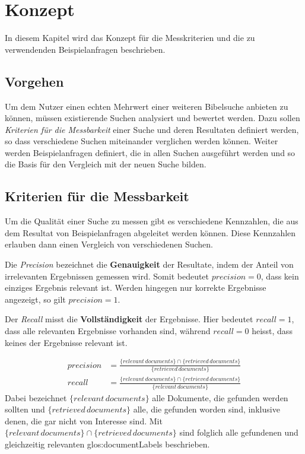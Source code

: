 \chapter{Konzept}
In diesem Kapitel wird das Konzept für die Messkriterien und die zu verwendenden Beispielanfragen beschrieben.

\section{Vorgehen}
Um dem Nutzer einen echten Mehrwert einer weiteren Bibelsuche anbieten zu können, müssen existierende Suchen analysiert und bewertet werden.
Dazu sollen \textit{Kriterien für die Messbarkeit} einer Suche und deren Resultaten definiert werden, so dass verschiedene Suchen miteinander verglichen werden können.
Weiter werden Beispielanfragen definiert, die in allen Suchen ausgeführt werden und so die Basis für den Vergleich mit der neuen Suche bilden.

\section{Kriterien für die Messbarkeit}
Um die Qualität einer Suche zu messen gibt es verschiedene Kennzahlen, die aus dem Resultat von Beispielanfragen abgeleitet werden können. Diese Kennzahlen erlauben dann einen Vergleich von verschiedenen Suchen.

Die \textit{Precision} bezeichnet die \textbf{Genauigkeit} der Resultate, indem der Anteil von irrelevanten Ergebnissen gemessen wird.
Somit bedeutet $precision = 0$, dass kein einziges Ergebnis relevant ist.
Werden hingegen nur korrekte Ergebnisse angezeigt, so gilt $precision = 1$.

Der \textit{Recall} misst die \textbf{Vollständigkeit} der Ergebnisse. Hier bedeutet $recall = 1$, dass alle relevanten Ergebnisse vorhanden sind, während $recall = 0$ heisst, dass keines der Ergebnisse relevant ist.

\begin{align}
	precision & = \frac{\{relevant \, documents\} \cap \{retrieved \, documents\}}{\{retrieved \, documents\}} \\
	recall & = \frac{\{relevant \, documents\} \cap \{retrieved \, documents\}}{\{relevant \, documents\}}
\end{align}
Dabei bezeichnet $\{relevant \, documents\}$ alle Dokumente, die gefunden werden sollten und $\{retrieved \, documents\}$ alle, die gefunden worden sind, inklusive denen, die gar nicht von Interesse sind.
Mit $\{relevant \, documents\} \cap \{retrieved \, documents\}$ sind folglich alle gefundenen und gleichzeitig relevanten \glspl{glos:documentLabel} beschrieben.

